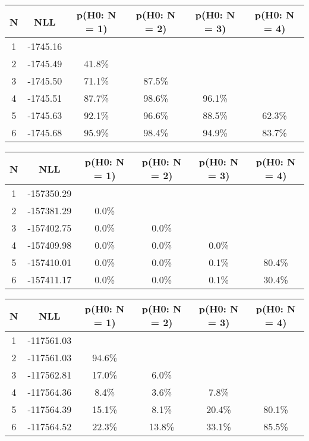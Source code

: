 \begin{table}[htb]
	\begin{center}
{\footnotesize\renewcommand{\arraystretch}{1.4}
		\begin{tabular}{cc||cccc}
			N & NLL & p(H0: N = 1) & p(H0: N = 2) & p(H0: N = 3) & p(H0: N = 4)\\ 
		\hline
1 & -1745.16 & & & & \\
2 & -1745.49 & 41.8\% & & & \\
3 & -1745.50 & 71.1\% & 87.5\% & & \\
4 & -1745.51 & 87.7\% & 98.6\% & 96.1\% & \\
5 & -1745.63 & 92.1\% & 96.6\% & 88.5\% & 62.3\% \\
6 & -1745.68 & 95.9\% & 98.4\% & 94.9\% & 83.7\% \\
	\end{tabular}
		\label{tab:lab}
	}
	\end{center}\end{table}

\begin{table}[htb]
	\begin{center}
{\footnotesize\renewcommand{\arraystretch}{1.4}
		\begin{tabular}{cc||cccc}
			N & NLL & p(H0: N = 1) & p(H0: N = 2) & p(H0: N = 3) & p(H0: N = 4)\\ 
		\hline
1 & -157350.29 & & & & \\
2 & -157381.29 & 0.0\% & & & \\
3 & -157402.75 & 0.0\% & 0.0\% & & \\
4 & -157409.98 & 0.0\% & 0.0\% & 0.0\% & \\
5 & -157410.01 & 0.0\% & 0.0\% & 0.1\% & 80.4\% \\
6 & -157411.17 & 0.0\% & 0.0\% & 0.1\% & 30.4\% \\
	\end{tabular}
		\label{tab:lab}
	}
	\end{center}\end{table}

\begin{table}[htb]
	\begin{center}
{\footnotesize\renewcommand{\arraystretch}{1.4}
		\begin{tabular}{cc||cccc}
			N & NLL & p(H0: N = 1) & p(H0: N = 2) & p(H0: N = 3) & p(H0: N = 4)\\ 
		\hline
1 & -117561.03 & & & & \\
2 & -117561.03 & 94.6\% & & & \\
3 & -117562.81 & 17.0\% & 6.0\% & & \\
4 & -117564.36 & 8.4\% & 3.6\% & 7.8\% & \\
5 & -117564.39 & 15.1\% & 8.1\% & 20.4\% & 80.1\% \\
6 & -117564.52 & 22.3\% & 13.8\% & 33.1\% & 85.5\% \\
	\end{tabular}
		\label{tab:lab}
	}
	\end{center}\end{table}

